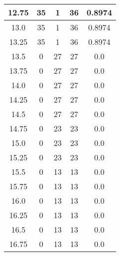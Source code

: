\documentclass[letterpaper, 12pt]{article}
\begin{document}
\begin{longtable}{|c|c|c|c|c|}
\hline
12.75 & 35 & 1 & 36 & 0.8974 \\
\hline
13.0 & 35 & 1 & 36 & 0.8974 \\
\hline
13.25 & 35 & 1 & 36 & 0.8974 \\
\hline
13.5 & 0 & 27 & 27 & 0.0 \\
\hline
13.75 & 0 & 27 & 27 & 0.0 \\
\hline
14.0 & 0 & 27 & 27 & 0.0 \\
\hline
14.25 & 0 & 27 & 27 & 0.0 \\
\hline
14.5 & 0 & 27 & 27 & 0.0 \\
\hline
14.75 & 0 & 23 & 23 & 0.0 \\
\hline
15.0 & 0 & 23 & 23 & 0.0 \\
\hline
15.25 & 0 & 23 & 23 & 0.0 \\
\hline
15.5 & 0 & 13 & 13 & 0.0 \\
\hline
15.75 & 0 & 13 & 13 & 0.0 \\
\hline
16.0 & 0 & 13 & 13 & 0.0 \\
\hline
16.25 & 0 & 13 & 13 & 0.0 \\
\hline
16.5 & 0 & 13 & 13 & 0.0 \\
\hline
16.75 & 0 & 13 & 13 & 0.0 \\
\hline
\end{longtable}
\end{document}
